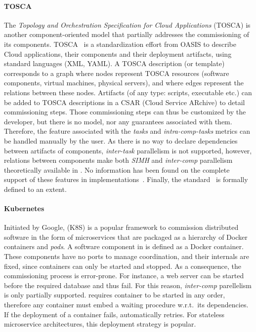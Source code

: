 \paragraph{TOSCA}
The \emph{Topology and Orchestration Specification for Cloud
Applications} (TOSCA) is another component-oriented model that
partially addresses the commissioning of its
components. TOSCA~\cite{tosca:web,brogi2018} is a standardization
effort from OASIS to describe Cloud applications, their components and
their deployment artifacts, using standard languages (\ie XML,
YAML). A TOSCA description (or template) corresponds to a graph where
nodes represent TOSCA resources (\eg software components, virtual
machines, physical servers), and where edges represent the relations
between these nodes. Artifacts (of any type: scripts, executable etc.)
can be added to TOSCA descriptions in a CSAR (Cloud Service ARchive)
to detail commissioning steps. Those commissioning steps can thus be
customized by the developer, but there is no model, nor any guarantees
associated with them. Therefore, the feature associated with
the \emph{tasks} and \emph{intra-comp-tasks} metrics can be handled
manually by the user. As there is no way to declare dependencies
between artifacts of components, \emph{inter-task} parallelism is not
supported, however, relations between components make both \emph{SIMH}
and \emph{inter-comp} parallelism theoretically available
in \tosca. No information has been found on the complete support of
these features in \tosca
implementations~\cite{cloudify:web,opentosca:web}. Finally, the \tosca
standard~\cite{7561358} is formally defined to an extent.

\paragraph{Kubernetes}
Initiated by Google, \kubernetes (K8S) is a popular framework to
commission distributed software in the form of microservices that are
packaged as a hierarchy of Docker containers and \emph{pods}. A
software component in \kubernetes is defined as a Docker
container. These components have no ports to manage coordination, and
their internals are fixed, since containers can only be started and
stopped. As a consequence, the commissioning process is
error-prone. For instance, a web server can be started before the
required database and thus fail. For this reason, \emph{inter-comp}
parellelism is only partially supported. \kubernetes requires
container to be started in any order, therefore any container must
embed a waiting procedure w.r.t.\ its dependencies. If the deployment of
a container fails, \kubernetes automatically retries. For stateless
microservice architectures, this deployment strategy is popular.

